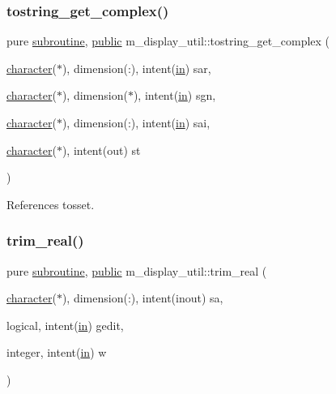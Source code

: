 \subsubsection{\texorpdfstring{tostring\+\_\+get\+\_\+complex()}{tostring\_get\_complex()}}
{\footnotesize\ttfamily pure \hyperlink{M__stopwatch_83_8txt_acfbcff50169d691ff02d4a123ed70482}{subroutine}, \hyperlink{M__stopwatch_83_8txt_a2f74811300c361e53b430611a7d1769f}{public} m\+\_\+display\+\_\+util\+::tostring\+\_\+get\+\_\+complex (\begin{DoxyParamCaption}\item[{\hyperlink{option__stopwatch_83_8txt_abd4b21fbbd175834027b5224bfe97e66}{character}($\ast$), dimension(\+:), intent(\hyperlink{M__journal_83_8txt_afce72651d1eed785a2132bee863b2f38}{in})}]{sar,  }\item[{\hyperlink{option__stopwatch_83_8txt_abd4b21fbbd175834027b5224bfe97e66}{character}($\ast$), dimension($\ast$), intent(\hyperlink{M__journal_83_8txt_afce72651d1eed785a2132bee863b2f38}{in})}]{sgn,  }\item[{\hyperlink{option__stopwatch_83_8txt_abd4b21fbbd175834027b5224bfe97e66}{character}($\ast$), dimension(\+:), intent(\hyperlink{M__journal_83_8txt_afce72651d1eed785a2132bee863b2f38}{in})}]{sai,  }\item[{\hyperlink{option__stopwatch_83_8txt_abd4b21fbbd175834027b5224bfe97e66}{character}($\ast$), intent(out)}]{st }\end{DoxyParamCaption})}



References tosset.

\mbox{\label{namespacem__display__util_ac428024047b90a34278426d21759faa0}} 
\subsubsection{\texorpdfstring{trim\+\_\+real()}{trim\_real()}}
{\footnotesize\ttfamily pure \hyperlink{M__stopwatch_83_8txt_acfbcff50169d691ff02d4a123ed70482}{subroutine}, \hyperlink{M__stopwatch_83_8txt_a2f74811300c361e53b430611a7d1769f}{public} m\+\_\+display\+\_\+util\+::trim\+\_\+real (\begin{DoxyParamCaption}\item[{\hyperlink{option__stopwatch_83_8txt_abd4b21fbbd175834027b5224bfe97e66}{character}($\ast$), dimension(\+:), intent(inout)}]{sa,  }\item[{logical, intent(\hyperlink{M__journal_83_8txt_afce72651d1eed785a2132bee863b2f38}{in})}]{gedit,  }\item[{integer, intent(\hyperlink{M__journal_83_8txt_afce72651d1eed785a2132bee863b2f38}{in})}]{w }\end{DoxyParamCaption})}



